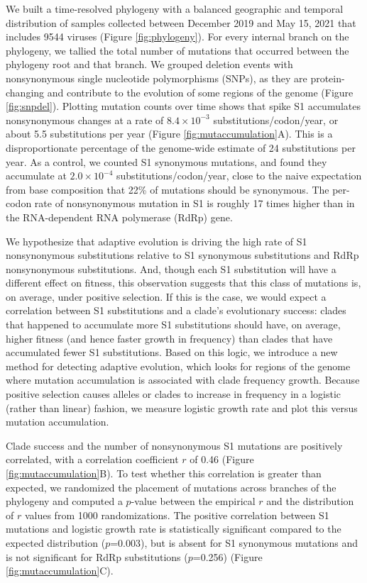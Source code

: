 \documentclass[11pt,oneside,letterpaper]{article}
\begin{document}
We built a time-resolved phylogeny with a balanced geographic and temporal distribution of samples collected between December 2019 and May 15, 2021 that includes 9544 viruses (Figure \ref{fig:phylogeny}).
For every internal branch on the phylogeny, we tallied the total number of mutations that occurred between the phylogeny root and that branch.
We grouped deletion events with nonsynonymous single nucleotide polymorphisms (SNPs), as they are protein-changing and contribute to the evolution of some regions of the genome (Figure \ref{fig:snpdel}).
Plotting mutation counts over time shows that spike S1 accumulates nonsynonymous changes at a rate of $8.4 \times 10^{-3}$ substitutions/codon/year, or about 5.5 substitutions per year (Figure \ref{fig:mutaccumulation}A).
This is a disproportionate percentage of the genome-wide estimate of 24 substitutions per year.
As a control, we counted S1 synonymous mutations, and found they accumulate at $2.0 \times 10^{-4}$ substitutions/codon/year, close to the naive expectation from base composition that 22\% of mutations should be synonymous.
The per-codon rate of nonsynonymous mutation in S1 is roughly 17 times higher than in the RNA-dependent RNA polymerase (RdRp) gene.

We hypothesize that adaptive evolution is driving the high rate of S1 nonsynonymous substitutions relative to S1 synonymous substitutions and RdRp nonsynonymous substitutions.
And, though each S1 substitution will have a different effect on fitness, this observation suggests that this class of mutations is, on average, under positive selection.
If this is the case, we would expect a correlation between S1 substitutions and a clade's evolutionary success: clades that happened to accumulate more S1 substitutions should have, on average, higher fitness (and hence faster growth in frequency) than clades that have accumulated fewer S1 substitutions.
Based on this logic, we introduce a new method for detecting adaptive evolution, which looks for regions of the genome where mutation accumulation is associated with clade frequency growth.
Because positive selection causes alleles or clades to increase in frequency in a logistic (rather than linear) fashion, we measure logistic growth rate and plot this versus mutation accumulation.

Clade success and the number of nonsynonymous S1 mutations are positively correlated, with a correlation coefficient $r$ of 0.46 (Figure \ref{fig:mutaccumulation}B).
To test whether this correlation is greater than expected, we randomized the placement of mutations across branches of the phylogeny and computed a $p$-value between the empirical $r$ and the distribution of $r$ values from 1000 randomizations.
The positive correlation between S1 mutations and logistic growth rate is statistically significant compared to the expected distribution ($p$=0.003), but is absent for S1 synonymous mutations and is not significant for RdRp substitutions ($p$=0.256) (Figure \ref{fig:mutaccumulation}C).
\end{document}
